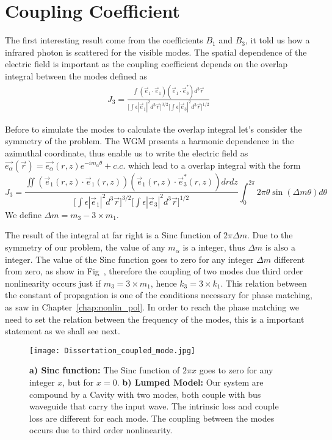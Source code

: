 \section{Coupling Coefficient}

The first interesting result come from the coefficients $B_1$ and $B_3$, it told us how a infrared photon is scattered for the visible modes. The spatial dependence of the electric field is important as the coupling coefficient depends on the overlap integral between the modes defined as 
\begin{eqnarray}
J_3 = \frac{\int
        (\vec{e}_1\cdot\vec{e}_1)(\vec{e}_1\cdot\vec{e}^*_3)
        d^3\vec{r}}{\Big[\int \epsilon|\vec{e}_1|^2 d^3\vec{r}\Big]^{3/2}\Big[\int \epsilon|\vec{e}_3|^2 d^3\vec{r}\Big]^{1/2}}
\end{eqnarray}

Before to simulate the modes to calculate the overlap integral let's consider the symmetry of the problem. The WGM presents a harmonic dependence in the azimuthal coordinate, thus enable us to write the electric field as $\vec{e_\alpha}(\vec{r}) = \vec{e_\alpha}(r,z)e^{-im_\alpha\theta}+c.c.$ which lead to a overlap integral with the form
\begin{equation}
    J_3 = \frac{\iint
        (\vec{e}_1(r,z)\cdot\vec{e}_1(r,z))(\vec{e}_1(r,z)\cdot\vec{e}^*_3(r,z))
        drdz}{\Big[\int \epsilon|\vec{e}_1|^2 d^3\vec{r}\Big]^{3/2}\Big[\int \epsilon|\vec{e}_3|^2 d^3\vec{r}\Big]^{1/2}} \int_0^{2\pi} 2\pi \theta \sin\left(\Delta m \theta\right)   d\theta
    \label{eq:overlap_j3}
\end{equation}
We define $\Delta m = m_3 -3\times m_1$. 

The result of the integral at far right is a Sinc function of $2\pi\Delta m$. Due to the symmetry of our problem, the value of any $m_\alpha$ is a integer, thus $\Delta m$ is also a integer. The value of the Sinc function goes to zero for any integer $\Delta m$ different from zero, as show in Fig~, therefore the coupling of two modes due third order nonlinearity occurs just if $m_3 = 3\times m_1$, hence $k_3 = 3 \times k_1$. This relation between the constant of propagation is one of the conditions necessary for phase matching, as saw in Chapter~\ref{chap:nonlin_pol}. In order to reach the phase matching we need to set the relation between the frequency of the modes, this is a important statement as we shall see next.  

\begin{figure}[t]
    \centering
    \texttt{[image: Dissertation\_coupled\_mode.jpg]}
    \caption{\textbf{a) Sinc function:} The Sinc function of $2\pi x$ goes to zero for any integer $x$, but for $x=0$. \textbf{b) Lumped Model:} Our system are compound by a Cavity with two modes, both couple with bus waveguide that carry the input wave. The intrinsic loss and couple loss are different for each mode. The coupling between the modes occurs due to third order nonlinearity. }
    \label{fig:toy_model}
\end{figure}

